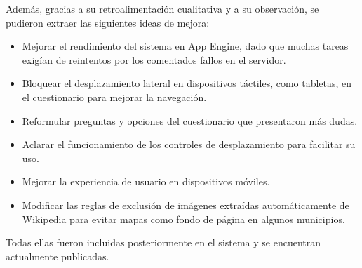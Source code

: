 Además, gracias a su retroalimentación cualitativa y a su observación, se pudieron extraer las siguientes ideas de mejora:

\begin{itemize}
    \item Mejorar el rendimiento del sistema en App Engine, dado que muchas tareas exigían de reintentos por los comentados fallos en el servidor.
    \item Bloquear el desplazamiento lateral en dispositivos táctiles, como tabletas, en el cuestionario para mejorar la navegación.
    \item Reformular preguntas y opciones del cuestionario que presentaron más dudas.
    \item Aclarar el funcionamiento de los controles de desplazamiento para facilitar su uso.
    \item Mejorar la experiencia de usuario en dispositivos móviles.
    \item Modificar las reglas de exclusión de imágenes extraídas automáticamente de Wikipedia para evitar mapas como fondo de página en algunos municipios.
\end{itemize}

Todas ellas fueron incluidas posteriormente en el sistema y se encuentran actualmente publicadas.
